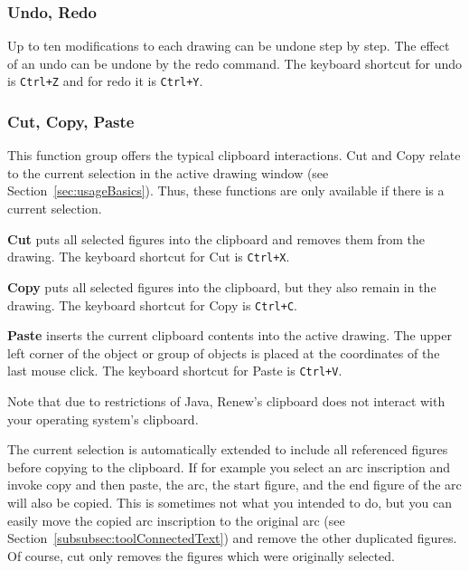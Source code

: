 \subsubsection{Undo, Redo}
Up to ten modifications to each drawing can be undone step by
step. The effect of an undo can be undone by the redo command. The keyboard shortcut for undo is \texttt{Ctrl+Z} and for redo it is \texttt{Ctrl+Y}.

\subsubsection{Cut, Copy, Paste}

This function group offers the typical clipboard interactions.
Cut and Copy relate to the current selection in the active drawing
window (see Section~\ref{sec:usageBasics}).
Thus, these functions are only available if there is a
current selection.

{\bf Cut} puts all selected figures into the clipboard and removes
them from the drawing. The keyboard shortcut for Cut is \texttt{Ctrl+X}.

{\bf Copy} puts all selected figures into the clipboard, but they
also remain in the drawing. The keyboard shortcut for Copy is \texttt{Ctrl+C}.

{\bf Paste} inserts the current clipboard contents into the active
drawing. The upper left corner of the object or group of objects is
placed at the coordinates of the last mouse click.
The keyboard shortcut for Paste is \texttt{Ctrl+V}.

Note that due to restrictions of Java, Renew's clipboard does not
interact with your operating system's clipboard.

The current selection is automatically extended
to include all referenced figures before copying to the clipboard.
If for example you select an arc inscription and invoke copy and
then paste, the arc, the start figure, and the end figure of the arc
will also be copied. This is sometimes not what you intended to do,
but you can easily move the copied arc inscription to the original
arc (see Section~\ref{subsubsec:toolConnectedText}) and remove the
other duplicated figures.
Of course, cut only removes the figures which were originally selected.




